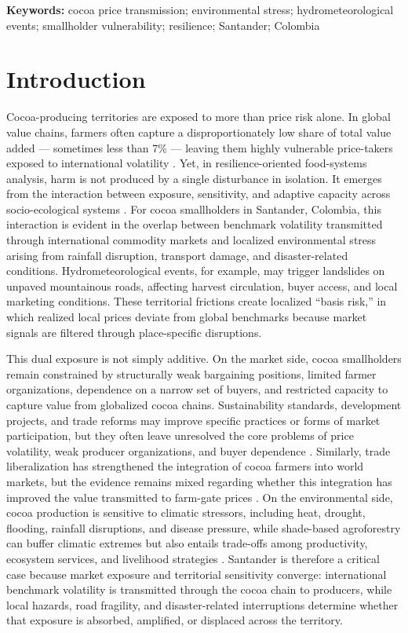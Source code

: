 \documentclass[11pt]{article}
\begin{document}
\textbf{Keywords:} cocoa price transmission; environmental stress; hydrometeorological events; smallholder vulnerability; resilience; Santander; Colombia

\section{Introduction}

Cocoa-producing territories are exposed to more than price risk alone. In global value chains, farmers often capture a disproportionately low share of total value added — sometimes less than 7\% — leaving them highly vulnerable price-takers exposed to international volatility \citep{CocoaBarometer2015, WCF2012}. Yet, in resilience-oriented food-systems analysis, harm is not produced by a single disturbance in isolation. It emerges from the interaction between exposure, sensitivity, and adaptive capacity across socio-ecological systems \citep{Turner2003,Adger2006,Tendall2015,Zurek2022}. For cocoa smallholders in Santander, Colombia, this interaction is evident in the overlap between benchmark volatility transmitted through international commodity markets and localized environmental stress arising from rainfall disruption, transport damage, and disaster-related conditions. Hydrometeorological events, for example, may trigger landslides on unpaved mountainous roads, affecting harvest circulation, buyer access, and local marketing conditions. These territorial frictions create localized ``basis risk,'' in which realized local prices deviate from global benchmarks because market signals are filtered through place-specific disruptions.

This dual exposure is not simply additive. On the market side, cocoa smallholders remain constrained by structurally weak bargaining positions, limited farmer organizations, dependence on a narrow set of buyers, and restricted capacity to capture value from globalized cocoa chains. Sustainability standards, development projects, and trade reforms may improve specific practices or forms of market participation, but they often leave unresolved the core problems of price volatility, weak producer organizations, and buyer dependence \citep{Mithofer2017}. Similarly, trade liberalization has strengthened the integration of cocoa farmers into world markets, but the evidence remains mixed regarding whether this integration has improved the value transmitted to farm-gate prices \citep{TsowouGayi2019}. On the environmental side, cocoa production is sensitive to climatic stressors, including heat, drought, flooding, rainfall disruptions, and disease pressure, while shade-based agroforestry can buffer climatic extremes but also entails trade-offs among productivity, ecosystem services, and livelihood strategies \citep{Jacobi2013,VaastSomarriba2014}. Santander is therefore a critical case because market exposure and territorial sensitivity converge: international benchmark volatility is transmitted through the cocoa chain to producers, while local hazards, road fragility, and disaster-related interruptions determine whether that exposure is absorbed, amplified, or displaced across the territory.
\end{document}
